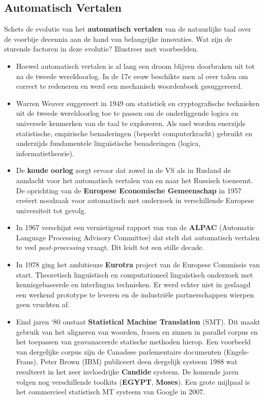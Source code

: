 \documentclass[../main.tex]{subfiles}
\begin{document}
\subsection{Automatisch Vertalen}
\begin{question}
Schets de evolutie van het \textbf{automatisch vertalen} van de natuurlijke taal over de voorbije decennia aan de hand van belangrijke innovaties.
Wat zijn de sturende factoren in deze evolutie?
Illustreer met voorbeelden.
\end{question}
\begin{solution}
\begin{itemize}
	\item Hoewel automatisch vertalen is al lang een droom blijven doorbraken uit tot na de tweede wereldoorlog. In de 17e eeuw beschikte men al over talen om correct te redeneren en werd een mechanisch woordenboek gesuggereerd.
	\item Warren Weaver suggereert in 1949 om statistiek en cryptografische technieken uit de tweede wereldoorlog toe te passen om de onderliggende logica en universele kenmerken van de taal te exploreren. Als snel worden enerzijds statistische, empirische benaderingen (beperkt computerkracht) gebruikt en anderzijds fundamentele linguïstische benaderingen (logica, informatietheorie).
	\item De \textbf{koude oorlog} zorgt ervoor dat zowel in de VS als in Rusland de aandacht voor het automatisch vertalen van en naar het Russisch toeneemt. De oprichting van de \textbf{Europese Economische Gemeenschap} in 1957 creëert noodzaak voor automatisch met onderzoek in verschillende Europese universiteit tot gevolg.
	\item In 1967 verschijnt een vernietigend rapport van van de \textbf{ALPAC} (Automatic Language Processing Advisory Committee) dat stelt dat automatisch vertalen te veel \emph{post-processing} vraagt. Dit leidt tot een stille decade.
	\item In 1978 ging het ambitieuze \textbf{Eurotra} project van de Europese Commissie van start. Theoretisch lingu\"istisch en computationeel lingu\"istisch onderzoek met kennisgebaseerde en interlingua technieken. Er werd echter niet in geslaagd een werkend prototype te leveren en de industri\"ele partnerschappen wierpen geen vruchten af.
	\item Eind jaren `80 onstaat \textbf{Statistical Machine Translation} (SMT). Dit maakt gebruik van het aligneren van woorden, frasen en zinnen in parallel corpus en het toepassen van geavanaceerde statische methoden hierop. Een voorbeeld van dergelijke corpus zijn de Canadese parlementaire documenten (Engels-Frans). Peter Brown (IBM) publiceert deen dergelijk systeem 1988 wat resulteert in het zeer invloedrijke \textbf{Candide} systeem. De komende jaren volgen nog verschillende toolkits (\textbf{EGYPT}, \textbf{Moses}). Een grote mijlpaal is het commercieel statistisch MT systeem van Google in 2007.
\end{itemize}
\end{solution}
\end{document}
